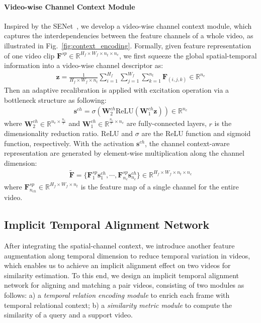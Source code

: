 \documentclass{article}
\begin{document}
\paragraph{Video-wise Channel Context Module}
Inspired by the SENet~\cite{hu2018squeeze}, we develop a video-wise channel context module, which captures the interdependencies between the feature channels of a whole video, as illustrated in Fig.~\ref{fig:context_encoding}.
Formally, given feature representation of one video clip $\mathbf{F}^{sp}\in\mathbb{R}^{H_f\times W_f\times n_t\times n_{c}}$, we first squeeze the global spatial-temporal information into a video-wise channel descriptor as:
\begin{align}
	\mathbf{z} = \frac{1}{H_f\times W_f\times n_t}\sum_{i=1}^{H_f}\sum_{j=1}^{W_f}\sum_{k=1}^{n_t}\mathbf{F}_{(i,j,k)}\in\mathbb{R}^{n_{c}}
\end{align}
Then an adaptive recalibration is applied with excitation operation via a bottleneck structure as following:
\begin{align}
\mathbf{s}^{ch} = \sigma(\mathbf{W}_2^{ch}\text{ReLU}(\mathbf{W}_1^{ch}\mathbf{z}))\in\mathbb{R}^{n_c}
\end{align}
where $\mathbf{W}^{ch}_2\in \mathbb{R}^{n_{c}\times\frac{n_{c}}{r}}$ and $\mathbf{W}^{ch}_1\in \mathbb{R}^{\frac{n_{c}}{r}\times n_{c}}$ are fully-connected layers, $r$ is the dimensionality reduction ratio. $\text{ReLU}$ and $\sigma$ are the ReLU function and sigmoid function, respectively.
With the activation $\mathbf{s}^{ch}$, the channel context-aware representation are generated by element-wise multiplication along the channel dimension:
\begin{align}
	\widetilde{\mathbf{F}}=\{\mathbf{F}^{sp}_{1}\mathbf{s}^{ch}_1,\cdots,\mathbf{F}^{sp}_{n_{c}}\mathbf{s}_{n_{c}}^{ch}\}\in\mathbb{R}^{H_f\times W_f\times n_t\times n_c}
\end{align}
where $\mathbf{F}_{n_{ch}}^{sp}\in\mathbb{R}^{H_f\times W_f\times n_t}$ is the feature map of a single channel for the entire video.


\subsection{Implicit Temporal Alignment Network}\label{sec:alignment}
After integrating the spatial-channel context, we introduce another feature augmentation along temporal dimension to reduce temporal variation in videos, which enables us to achieve an implicit alignment effect on two videos for similarity estimation. To this end, we design an implicit temporal alignment network for aligning and matching a pair videos, consisting of two modules as follows: a) a \textit{temporal relation encoding module} to enrich each frame with temporal relational context; b) a \textit{similarity metric module} to compute the similarity of a query and a support video.
\end{document}
